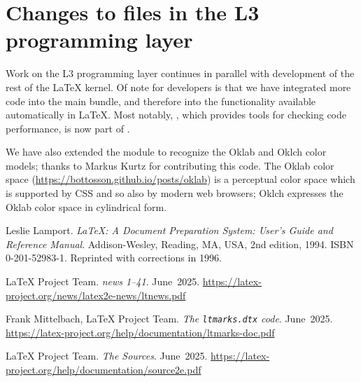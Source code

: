 \documentclass{ltnews}
\begin{document}
\section{Changes to files in the L3 programming layer}


Work on the L3 programming layer continues in parallel with
development of the rest of the \LaTeX{} kernel.  Of note for
developers is that we have integrated more code into the main
 bundle, and therefore into the functionality available
automatically in \LaTeX{}. Most notably, , which
provides tools for checking code performance, is now part of
.

We have also extended the  module to recognize the Oklab
and Oklch color models; thanks to Markus Kurtz for contributing this
code. The Oklab color space
(\url{https://bottosson.github.io/posts/oklab}) is a perceptual color
space which is supported by CSS and so also by modern web browsers;
Oklch expresses the Oklab color space in cylindrical form.


\begin{thebibliography}{9}\frenchspacing


Leslie Lamport.
\newblock \emph{{\LaTeX}: {A} Document Preparation System: User's Guide and Reference
  Manual}.
\newblock \mbox{Addison}-Wesley, Reading, MA, USA, 2nd edition, 1994.
\newblock ISBN 0-201-52983-1.
\newblock Reprinted with corrections in 1996.

 \LaTeX{} Project Team.
  \emph{\LaTeXe{} news 1--41}. June~2025.
  \url{https://latex-project.org/news/latex2e-news/ltnews.pdf}

 Frank Mittelbach, \LaTeX{} Project Team.
  \emph{The \texttt{ltmarks.dtx} code}. June~2025.
  \url{https://latex-project.org/help/documentation/ltmarks-doc.pdf}

 \LaTeX{} Project Team.
  \emph{The \LaTeXe{} Sources}. June~2025.
  \url{https://latex-project.org/help/documentation/source2e.pdf}

\end{thebibliography}
\end{document}
